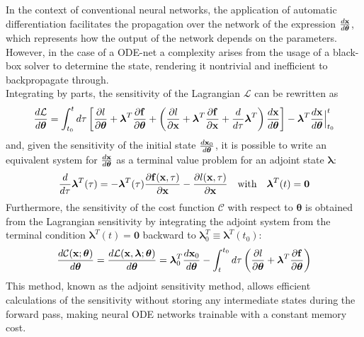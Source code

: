 In the context of conventional neural networks, the application of automatic differentiation facilitates the propagation over the network 
of the expression $\frac{d\mathbf{x}}{d\boldsymbol{\theta}}$, which represents how the output of the network depends on the parameters.
However, in the case of a ODE-net a complexity arises from the usage of a black-box solver to determine the state, 
rendering it nontrivial and inefficient to backpropagate through.\\
Integrating by parts, the sensitivity of the Lagrangian $\mathcal{L}$ can be rewritten as 
$$
\frac{d\mathcal{L}}{d\boldsymbol{\theta}} = \int_{t_0}^{t} d\tau \left[\frac{\partial l}{\partial \boldsymbol{\theta}} + \boldsymbol{\lambda}^T \frac{\partial \mathbf{f}}{\partial \boldsymbol{\theta}} + \left(\frac{\partial l}{\partial \mathbf{x}} + \boldsymbol{\lambda}^T \frac{\partial \mathbf{f}}{\partial \mathbf{x}} + \frac{d}{d\tau}\boldsymbol{\lambda}^T\right) \frac{d\mathbf{x}}{d\boldsymbol{\theta}} \right] - \boldsymbol{\lambda}^T \frac{d\mathbf{x}}{d\boldsymbol{\theta}} \Big\vert_{t_0}^{t} \\
$$
and, given the sensitivity of the initial state $\frac{d\mathbf{x}_0}{d\boldsymbol{\theta}}$, 
it is possible to write an equivalent system for $\frac{d\mathbf{x}}{d\boldsymbol{\theta}}$ as a terminal value problem for an adjoint state $\boldsymbol{\lambda}$:
\begin{equation}
  \label{eq:adjoint_ode}
  \frac{d}{d\tau}\boldsymbol{\lambda}^{T}(\tau) = - \boldsymbol{\lambda}^{T}(\tau) \frac{\partial \mathbf{f}(\mathbf{x}, \tau)}{\partial \mathbf{x}} - \frac{\partial l(\mathbf{x}, \tau)}{\partial \mathbf{x}} \quad \text{with} \quad \boldsymbol{\lambda}^{T}(t) = \mathbf{0}
\end{equation}
Furthermore, the sensitivity of the cost function $\mathcal{C}$ with respect to $\boldsymbol{\theta}$ is obtained from the Lagrangian sensitivity by
integrating the adjoint system from the terminal condition $\boldsymbol{\lambda}^{T}(t) = \mathbf{0}$ backward to $\boldsymbol{\lambda}_{0}^{T} \equiv \boldsymbol{\lambda}^{T}(t_0)$: 
\begin{equation}
  \label{eq:loss_sensitivity}
  \frac{d\mathcal{C}(\mathbf{x}; \boldsymbol{\theta})}{d\boldsymbol{\theta}} 
  = \frac{d\mathcal{L}(\mathbf{x}, \boldsymbol{\lambda}; \boldsymbol{\theta})}{d\boldsymbol{\theta}} 
  = \boldsymbol{\lambda}^T_0 \frac{d\mathbf{x}_0}{d\boldsymbol{\theta}} - \int_{t}^{t_0} d\tau \left(\frac{\partial l}{\partial \boldsymbol{\theta}} + \boldsymbol{\lambda}^T \frac{\partial \mathbf{f}}{\partial \boldsymbol{\theta}}\right)  
\end{equation}
This method, known as the adjoint sensitivity method, allows efficient calculations of the sensitivity without storing any intermediate states during the forward pass, making neural ODE networks trainable with a constant memory cost.\\

